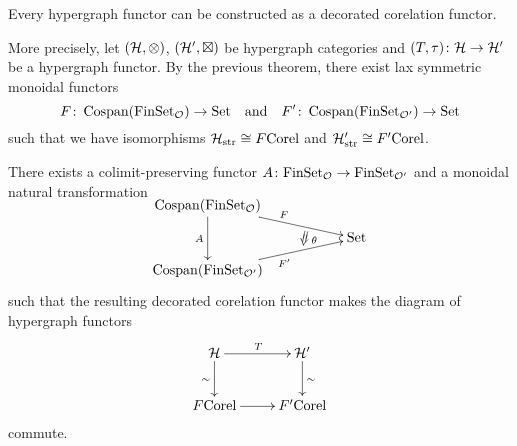 \begin{theorem} \label{thm.hypdeccorfunctors}
  Every hypergraph functor can be constructed as a decorated corelation functor.
  
  More precisely, let $(\mathcal H,\otimes)$, $(\mathcal H',\boxtimes)$ be hypergraph
  categories and $(T,\tau){\colon} \mathcal H \to \mathcal H'$ be a hypergraph functor. By
  the previous theorem, there exist lax symmetric monoidal functors
  \[
    F{\colon} \operatorname{{Cospan}}(\mathrm{FinSet}_{\mathcal O}) \to \mathrm{Set} \quad \mbox{and} \quad F'{\colon}
    \operatorname{{Cospan}}(\mathrm{FinSet}_{\mathcal O'}) \to \mathrm{Set}
  \]
  such that we have isomorphisms $\mathcal H_{\mathrm{str}} \cong F\mathrm{Corel}$
  and $\mathcal H_{\mathrm{str}}' \cong F'\mathrm{Corel}$.
  
  There exists a colimit-preserving functor $A{\colon} \mathrm{FinSet}_{\mathcal O} \to
  \mathrm{FinSet}_{\mathcal O'}$ and a monoidal natural transformation
  \[
    \xymatrixrowsep{2ex}
    \xymatrix{
      \cospan(\FinSet_{\mc O}) \ar[dd]_{A} \ar[drr]^F  \\
      &\twocell \omit{_\:\theta}& \Set \\
      \cospan(\FinSet_{\mc O'}) \ar[urr]_{F'} 
    }
  \]
  such that the resulting decorated corelation functor makes the
  diagram of hypergraph functors
  \[
    \xymatrix{
      \mc H \ar[d]_\sim \ar[r]^{T} & \mc H' \ar[d]^\sim \\
      F\mathrm{Corel} \ar[r] & F'\mathrm{Corel}
    }
  \]
  commute.
\end{theorem}
